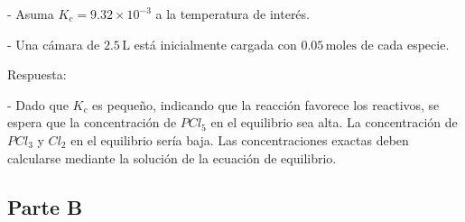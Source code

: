 \documentclass[11pt]{article}
\begin{document}
\begin{enumerate}
            - Asuma \(K_c = 9.32 \times 10^{-3}\) a la temperatura de interés.

            - Una cámara de \(2.5 \, \text{L}\) está inicialmente cargada con \(0.05 \, \text{moles}\) de cada especie.
            
            Respuesta:

            - Dado que \(K_c\) es pequeño, indicando que la reacción favorece los reactivos, se espera que la concentración de \(PCl_5\) en el equilibrio sea alta. La concentración de \(PCl_3\) y \(Cl_2\) en el equilibrio sería baja. Las concentraciones exactas deben calcularse mediante la solución de la ecuación de equilibrio.
        \end{enumerate}
    \subsection{Parte B}
\end{document}
